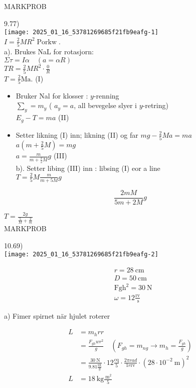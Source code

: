 \documentclass[10pt]{article}
\begin{document}
MARKPROB

9.77)\\
\texttt{[image: 2025\_01\_16\_53781269685f21fb9eafg-1]}\\
$I=\frac{2}{5} M R^{2} \operatorname{Porkw}$.\\
a). Brukes NaL for rotasjorn:\\
$\Sigma \tau=I \alpha \quad(a=\alpha R)$\\
$T R=\frac{2}{5} M R^{2} \cdot \frac{0}{R}$\\
$T=\frac{2}{5} \mathrm{Ma}$. (I)

\begin{itemize}
  \item Bruker Nal for klosser : $y$-renning\\
$\sum_{y}=m_{y}$ ( $a_{y}=a$, all bevegelse slyer i $y$-retring)\\
$E_{g}-T=m a$ (II)
  \item Setter likning (I) inn; likning (II) og far $m g-\frac{2}{5} M a=m a$\\
$a\left(m+\frac{2}{5} M\right)=m g$\\
$a=\frac{m}{m+\frac{2}{s} M} g$ (III)\\
b). Setter libing (III) inn : libsing (I) eor a line\\
$T=\frac{2}{5} M \frac{m}{m+5 M} g$
\end{itemize}

$$
\frac{2 m M}{5 m+2 M} g
$$

$T=\frac{2 g}{\frac{5}{M}+\frac{2}{m}}$\\

MARKPROB

10.69)\\
\texttt{[image: 2025\_01\_16\_53781269685f21fb9eafg-2]}

$$
\begin{aligned}
& r=28 \mathrm{~cm} \\
& D=50 \mathrm{~cm} \\
& \mathrm{Fgh}^{2}=30 \mathrm{~N} \\
& \omega=12 \frac{\mathrm{rv}}{\mathrm{~s}}
\end{aligned}
$$

a) Fimer spirnet när hjulet roterer

$$
\begin{aligned}
L & =m_{h} r r \\
& =\frac{F_{g h} w r^{2}}{g} \quad\left(F_{g h}=m_{n g} \rightarrow m_{h}=\frac{F_{g h}}{g}\right) \\
& =\frac{30 \mathrm{~N}}{9.81 \frac{\mathrm{gg}}{g}} \cdot 12 \frac{\mathrm{cq}}{5} \cdot \frac{2 \pi r a d}{1 r \mathrm{rv}} \cdot\left(28 \cdot 10^{-2} \mathrm{~m}\right)^{2} \\
L & =18 \mathrm{~kg} \frac{\mathrm{~m}^{2}}{5}
\end{aligned}
$$
\end{document}
